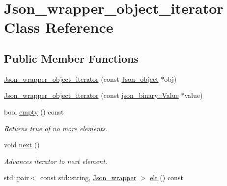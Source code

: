 \hypertarget{classJson__wrapper__object__iterator}{}\section{Json\+\_\+wrapper\+\_\+object\+\_\+iterator Class Reference}
\label{classJson__wrapper__object__iterator}
\subsection*{Public Member Functions}
\begin{DoxyCompactItemize}
\item 
\mbox{\hyperlink{classJson__wrapper__object__iterator_a22cb12777a4640d78d14b8d5fb1d8360}{Json\+\_\+wrapper\+\_\+object\+\_\+iterator}} (const \mbox{\hyperlink{classJson__object}{Json\+\_\+object}} $\ast$obj)
\item 
\mbox{\hyperlink{classJson__wrapper__object__iterator_a98b459bb09cf65a32f8332c208103a7b}{Json\+\_\+wrapper\+\_\+object\+\_\+iterator}} (const \mbox{\hyperlink{classjson__binary_1_1Value}{json\+\_\+binary\+::\+Value}} $\ast$value)
\item 
\mbox{\label{classJson__wrapper__object__iterator_adc1d68908e72feb28498564b21c27cd1}} 
bool \mbox{\hyperlink{classJson__wrapper__object__iterator_adc1d68908e72feb28498564b21c27cd1}{empty}} () const
\begin{DoxyCompactList}\small\item\em Returns true of no more elements. \end{DoxyCompactList}\item 
\mbox{\label{classJson__wrapper__object__iterator_a9de91e30f63ca06472ced787bccbbdef}} 
void \mbox{\hyperlink{classJson__wrapper__object__iterator_a9de91e30f63ca06472ced787bccbbdef}{next}} ()
\begin{DoxyCompactList}\small\item\em Advances iterator to next element. \end{DoxyCompactList}\item 
std\+::pair$<$ const std\+::string, \mbox{\hyperlink{classJson__wrapper}{Json\+\_\+wrapper}} $>$ \mbox{\hyperlink{classJson__wrapper__object__iterator_a9e797ed531962494b1d317221e524d1d}{elt}} () const
\end{DoxyCompactItemize}


